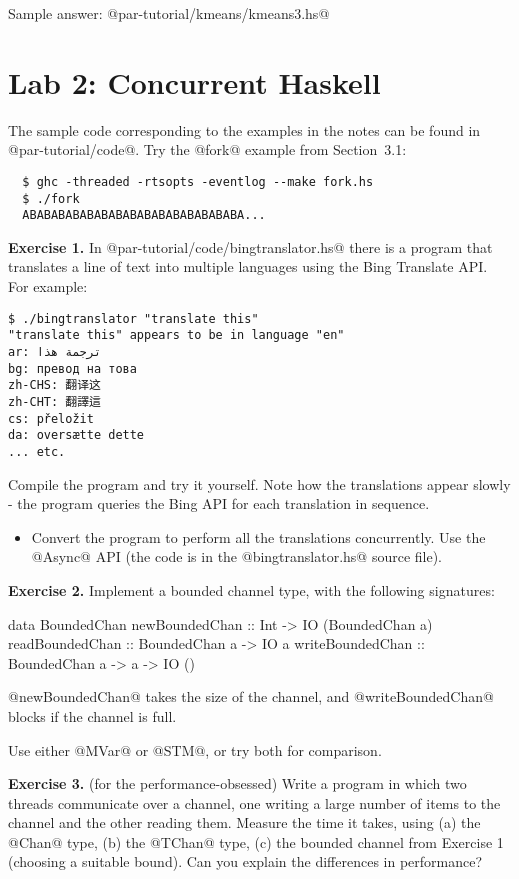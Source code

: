 \documentclass[11pt,a4paper]{article}
\newcommand{\Section}[2]{\section{#2}\label{sec:#1}}
\begin{document}
Sample answer: @par-tutorial/kmeans/kmeans3.hs@

\newpage\Section{conc}{Lab 2: Concurrent Haskell}

The sample code corresponding to the examples in the notes can be
found in @par-tutorial/code@.  Try the @fork@ example from
Section~3.1:

{\small \begin{verbatim}
  $ ghc -threaded -rtsopts -eventlog --make fork.hs
  $ ./fork
  ABABABABABABABABABABABABABABABA...
\end{verbatim}}

\textbf{Exercise 1.} In @par-tutorial/code/bingtranslator.hs@ there is
a program that translates a line of text into multiple languages using
the Bing Translate API.  For example:

{\small \begin{verbatim}
$ ./bingtranslator "translate this"
"translate this" appears to be in language "en"
ar: ترجمة هذا
bg: превод на това
zh-CHS: 翻译这
zh-CHT: 翻譯這
cs: přeložit
da: oversætte dette
... etc.
\end{verbatim}}

\noindent Compile the program and try it yourself.  Note how the
translations appear slowly - the program queries the Bing API for each
translation in sequence.

\begin{itemize}
\item Convert the program to perform all the translations
  concurrently.  Use the @Async@ API (the code is in the
  @bingtranslator.hs@ source file).
\end{itemize}

\textbf{Exercise 2.} Implement a bounded channel type, with the
following signatures:

\begin{haskell}
data BoundedChan
newBoundedChan  :: Int -> IO (BoundedChan a)
readBoundedChan :: BoundedChan a -> IO a
writeBoundedChan :: BoundedChan a -> a -> IO ()
\end{haskell}

\noindent @newBoundedChan@ takes the size of the channel, and
@writeBoundedChan@ blocks if the channel is full.

Use either @MVar@ or @STM@, or try both for comparison.

\textbf{Exercise 3.} (for the performance-obsessed) Write a program in which
two threads communicate over a channel, one writing a large number of
items to the channel and the other reading them.  Measure the time it
takes, using (a) the @Chan@ type, (b) the @TChan@ type, (c) the
bounded channel from Exercise 1 (choosing a suitable bound).  Can you
explain the differences in performance?
\end{document}

